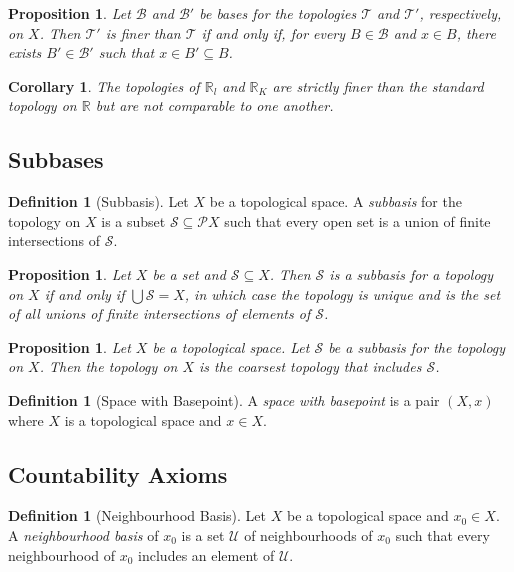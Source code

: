 \documentclass{book}
\newtheorem{prop}[ax]{Proposition}
\newtheorem{cor}{Corollary}[ax]
\theoremstyle{definition}
\newtheorem{df}[ax]{Definition}
\begin{document}
\begin{prop}
Let $\mathcal{B}$ and $\mathcal{B}'$ be bases for the topologies $\mathcal{T}$ and $\mathcal{T}'$, respectively, on $X$. Then $\mathcal{T}'$ is finer than $\mathcal{T}$ if and only if, for every $B \in \mathcal{B}$ and $x \in B$, there exists $B' \in \mathcal{B}'$ such that $x \in B' \subseteq B$.
\end{prop}

\begin{cor}
The topologies of $\mathbb{R}_l$ and $\mathbb{R}_K$ are strictly finer than the standard topology on $\mathbb{R}$ but are not comparable to one another.
\end{cor}

\subsection{Subbases}

\begin{df}[Subbasis]
Let $X$ be a topological space. A \emph{subbasis} for the topology on $X$ is a subset $\mathcal{S} \subseteq \mathcal{P} X$ such that every open set is a union of finite intersections of $\mathcal{S}$.
\end{df}

\begin{prop}
Let $X$ be a set and $\mathcal{S} \subseteq X$. Then $\mathcal{S}$ is a subbasis for a topology on $X$ if and only if $\bigcup \mathcal{S} = X$, in which case the topology is unique and is the set of all unions of finite intersections of elements of $\mathcal{S}$.
\end{prop}

\begin{prop}
Let $X$ be a topological space.
Let $\mathcal{S}$ be a subbasis for the topology on $X$.
Then the topology on $X$ is the coarsest topology that includes $\mathcal{S}$.
\end{prop}

\begin{df}[Space with Basepoint]
A \emph{space with basepoint} is a pair $(X,x)$ where $X$ is a topological space and $x \in X$.
\end{df}

\subsection{Countability Axioms}

\begin{df}[Neighbourhood Basis]
Let $X$ be a topological space and $x_0 \in X$. A \emph{neighbourhood basis} of $x_0$ is a set $\mathcal{U}$ of neighbourhoods of $x_0$ such that every neighbourhood of $x_0$ includes an element of $\mathcal{U}$.
\end{df}
\end{document}

